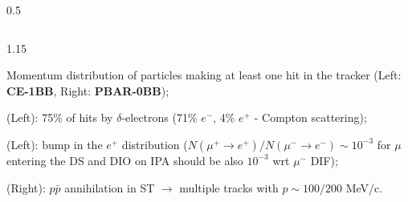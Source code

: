 \documentclass{beamer}
\begin{document}
\begin{frame}
\begin{columns}
\begin{column}{0.5\framewidth}
\begin{figure}[!h]
       \label{fig:momhits}
\end{figure}
        \end{column}
    \end{columns}
    \vspace{-3mm}
    \begin{columns}
        \begin{column}{1.15\framewidth}
    \setlength{\leftmargini}{1.2em}
    \begin{itemize}
    {\small
            \item Momentum distribution of particles making at least one hit in the tracker (Left: \textbf{CE-1BB}, Right: \textbf{PBAR-0BB});
            \vspace{2.5mm}
            \item (Left): 75\% of hits by $\delta$-electrons (71\% $e^-$, 4\% $e^+$ - Compton scattering);
              \vspace{2.5mm}
            \item (Left): bump in the $e^+$ distribution ($N(\mu^+ \rightarrow e^+ )/N(\mu^- \rightarrow e^-) \sim 10^{-3}$ for $\mu$ entering the DS and DIO on IPA should be also $10^{-3}$ wrt $\mu^-$ DIF);
              \vspace{2.5mm}
            \item  (Right): $p\bar{p}$ annihilation in ST $\rightarrow$ multiple tracks with $p \sim 100/200$ MeV/c.
          
}
           \end{itemize} 
        \end{column}
      
    \end{columns}
\end{frame}
\end{document}
